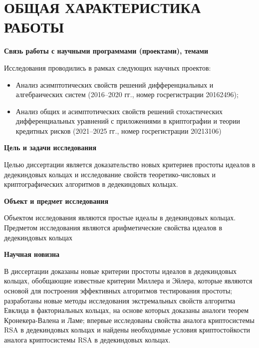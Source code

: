 \documentclass[_00_dissertation.tex]{subfiles}
\begin{document}
\onlyinsubfile{
    \renewcommand{\contentsname}{ОГЛАВЛЕНИЕ}
    \setcounter{tocdepth}{3}
    \tableofcontents
}

\chapter*{ОБЩАЯ ХАРАКТЕРИСТИКА РАБОТЫ}

\begin{center}
\textbf{Связь работы с научными программами (проектами), темами}
\end{center}

Исследования проводились в рамках следующих научных проектов:
\begin{itemize}
    \item Анализ асимптотических свойств решений дифференциальных и алгебраических систем (2016--2020 гг., номер госрегистрации 20162496);

    \item Анализ общих и асимптотических свойств решений стохастических дифференциальных уравнений с приложениями в криптографии и теории кредитных рисков (2021--2025 гг., номер госрегистрации 20213106)
\end{itemize}

\begin{center}
\textbf{Цель и задачи исследования}
\end{center}

Целью диссертации является доказательство новых критериев простоты идеалов в дедекиндовых кольцах и исследование свойств теоретико-числовых и криптографических алгоритмов в дедекиндовых кольцах.

\begin{center}
\textbf{Объект и предмет исследования}
\end{center}

Объектом исследования являются простые идеалы в дедекиндовых кольцах.
Предметом исследования являются арифметические свойства идеалов в дедекиндовых кольцах

\begin{center}
\textbf{Научная новизна}
\end{center}

В диссертации доказаны новые критерии простоты идеалов в дедекиндовых кольцах, обобщающие известные критерии Миллера и Эйлера, которые являются основой для построения эффективных алгоритмов тестирования простоты; разработаны новые методы исследования экстремальных свойств алгоритма Евклида в факториальных кольцах, на основе которых доказаны аналоги теорем Кронекера-Валена и Ламе; впервые исследованы свойства аналога криптосистемы RSA в дедекиндовых кольцах и найдены необходимые условия криптостойкости аналога криптосистемы RSA в дедекиндовых кольцах.
\end{document}
